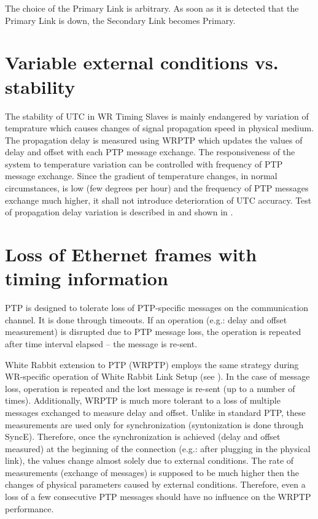 The choice of the Primary Link is arbitrary. As soon as it is detected that the
Primary Link is down, the Secondary Link becomes Primary.


\section{Variable external conditions vs. stability}

The stability of UTC in WR Timing Slaves is mainly endangered by variation of
temprature which causes changes of signal propagation speed in physical medium. 
The propagation delay is measured using WRPTP which updates the values of delay
and offset with each PTP message exchange. The responsiveness of the system to
temperature variation can be controlled with frequency of PTP message exchange.
Since the gradient of temperature changes, in normal circumstances, is low (few
degrees per hour) and the frequency of PTP messages exchange much higher, it
shall not introduce deterioration of UTC accuracy. Test of propagation delay
variation is described in \cite{TomekMSc} and shown in \cite{WRdemo}. 

\section{Loss of Ethernet frames with timing information}

PTP is designed to tolerate loss of PTP-specific messages on the
communication channel. It is done through timeouts. If an operation (e.g.:
delay and offset measurement) is disrupted due to PTP message loss, the
operation is repeated after time interval elapsed -- the message is
re-sent.

White Rabbit extension to PTP (WRPTP) employs the same strategy during
WR-specific operation of White Rabbit Link Setup (see \cite{WRPTP}). In the case
of message loss, operation is repeated and the lost message is re-sent (up to a
number of times). Additionally, WRPTP is much more tolerant to a loss of
multiple messages exchanged to measure delay and offset. Unlike in
standard PTP, these measurements are used only for synchronization
(syntonization is done through SyncE). Therefore, once the synchronization is
achieved (delay and offset measured) at the beginning of the connection (e.g.:
after plugging in the physical link), the values change almost solely due
to external conditions. The rate of measurements (exchange of messages) is
supposed to be much higher then the changes of physical parameters caused by
external conditions. Therefore, even a loss of a few consecutive PTP messages
should have no influence on the WRPTP performance.
